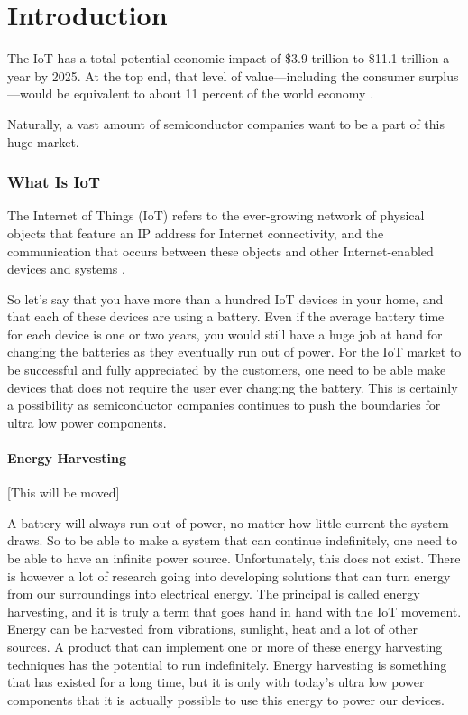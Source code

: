 \chapter{Introduction}

The IoT has a total potential economic impact of \$3.9 trillion to \$11.1 trillion a year by 2025. At the top end, that level of value—including the consumer surplus—would be equivalent to about 11 percent of the world economy \cite{mckinsey15}.

Naturally, a vast amount of semiconductor companies want to be a part of this huge market.

\subsection{What Is IoT}

The Internet of Things (IoT) refers to the ever-growing network of physical objects that feature an IP address for Internet connectivity, and the communication that occurs between these objects and other Internet-enabled devices and systems \cite{webopedia}.

So let's say that you have more than a hundred IoT devices in your home, and that each of these devices are using a battery. Even if the average battery time for each device is one or two years, you would still have a huge job at hand for changing the batteries as they eventually run out of power. For the IoT market to be successful and fully appreciated by the customers, one need to be able make devices that does not require the user ever changing the battery. This is certainly a possibility as semiconductor companies continues to push the boundaries for ultra low power components.  

\newpage

\subsubsection{Energy Harvesting}

[This will be moved]

A battery will always run out of power, no matter how little current the system draws. So to be able to make a system that can continue indefinitely, one need to be able to have an infinite power source. Unfortunately, this does not exist. There is however a lot of research going into developing solutions that can turn energy from our surroundings into electrical energy. The principal is called energy harvesting, and it is truly a term that goes hand in hand with the IoT movement. Energy can be harvested from vibrations, sunlight, heat and a lot of other sources. A product that can implement one or more of these energy harvesting techniques has the potential to run indefinitely. Energy harvesting is something that has existed for a long time, but it is only with today's ultra low power components that it is actually possible to use this energy to power our devices.